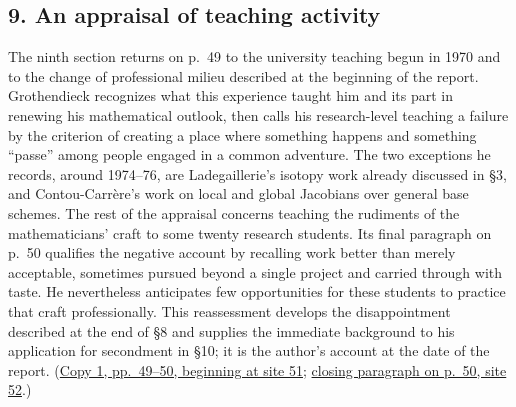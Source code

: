 \subsection*{9. An appraisal of teaching activity}
The ninth section returns on p.~49 to the university teaching begun in
1970 and to the change of professional milieu described at the beginning
of the report. Grothendieck recognizes what this experience taught him
and its part in renewing his mathematical outlook, then calls his
research-level teaching a failure by the criterion of creating a place
where something happens and something ``passe'' among people engaged in
a common adventure. The two exceptions he records, around 1974--76, are
Ladegaillerie's isotopy work already discussed in \S3, and
Contou-Carrère's work on local and global Jacobians over general base
schemes. The rest of the appraisal concerns teaching the rudiments of
the mathematicians' craft to some twenty research students. Its final
paragraph on p.~50 qualifies the negative account by recalling work
better than merely acceptable, sometimes pursued beyond a single
project and carried through with taste. He nevertheless anticipates few
opportunities for these students to practice that craft professionally.
This reassessment develops the disappointment described at the end of
\S8 and supplies the immediate background to his application for
secondment in \S10; it is the author's account at the date of the report.
(\href{https://grothendieck.umontpellier.fr/web/viewer.html?file=../119.pdf\#page=52}{Copy 1, pp.~49--50, beginning at site 51};
\href{https://grothendieck.umontpellier.fr/web/viewer.html?file=../119.pdf\#page=53}{closing paragraph on p.~50, site 52}.)
